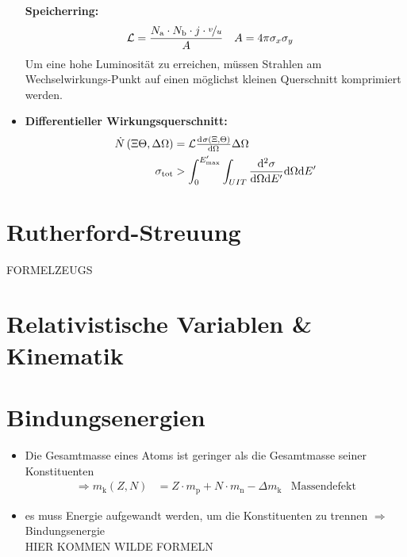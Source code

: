 \documentclass[BCOR=5mm,DIV=calc,listof=totoc,headings=big]{scrartcl}
\newcommand{\de}{\mathrm{d}}
\begin{document}
\begin{itemize}
  \textbf{Speicherring:}
  \begin{align*}
    \mathcal{L}&=\frac{N_{\mathrm{a}} \cdot N_{\mathrm{b}} \cdot j
      \cdot \nicefrac{v}{u}}{A} & A&=4\pi \sigma_{x} \sigma_{y}
  \end{align*}
  Um eine hohe Luminosität zu erreichen, müssen Strahlen am
  Wechselwirkungs-Punkt auf einen möglichst kleinen Querschnitt
  komprimiert werden.
\item \textbf{Differentieller Wirkungsquerschnitt:}
  \begin{align*}
    \dot{N}\del{\Xi \Theta, \Delta \Omega}&=\mathcal{L}
    \od{\sigma(\Xi, \Theta)}{\Omega}\Delta \Omega\\
    \sigma_{\text{tot}}&>\int_{0}^{E^{\prime}_{\text{max}}}\int_{UIT} \frac{\de
   ^{2}\sigma}{\de\Omega\de E^{\prime}}\de\Omega\de E^{\prime}
  \end{align*}
\end{itemize}

\section{Rutherford-Streuung}
\label{sec:rutherford-streuung}
FORMELZEUGS

\section{Relativistische Variablen \& Kinematik}
\label{sec:relat-vari-}

\section{Bindungsenergien}
\label{sec:bindungsenergien}
\begin{itemize}
\item Die Gesamtmasse eines Atoms ist geringer als die Gesamtmasse
  seiner Konstituenten
  \begin{align*}
    \Rightarrow m_{\mathrm{k}}(Z,N)&=Z \cdot m_{\mathrm{p}} + N \cdot
    m_{\mathrm{n}} - \Delta m_{\mathrm{k}} & \text{Massendefekt}
  \end{align*}
\item es muss Energie aufgewandt werden, um die Konstituenten zu
  trennen $\Rightarrow$ Bindungsenergie\\
HIER KOMMEN WILDE FORMELN
\end{itemize}
\end{document}
